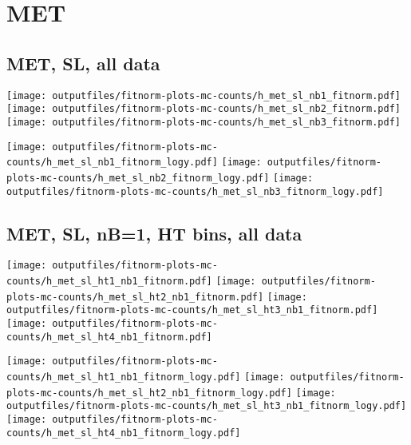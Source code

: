\documentclass[11pt]{article}
\begin{document}
  \pagebreak
  \clearpage
  \tableofcontents
  \clearpage





    \section{MET}
     \subsection{ MET, SL, all data}

    \noindent
     \texttt{[image: outputfiles/fitnorm-plots-mc-counts/h\_met\_sl\_nb1\_fitnorm.pdf]}
     \texttt{[image: outputfiles/fitnorm-plots-mc-counts/h\_met\_sl\_nb2\_fitnorm.pdf]}
     \texttt{[image: outputfiles/fitnorm-plots-mc-counts/h\_met\_sl\_nb3\_fitnorm.pdf]}

    \noindent
     \texttt{[image: outputfiles/fitnorm-plots-mc-counts/h\_met\_sl\_nb1\_fitnorm\_logy.pdf]}
     \texttt{[image: outputfiles/fitnorm-plots-mc-counts/h\_met\_sl\_nb2\_fitnorm\_logy.pdf]}
     \texttt{[image: outputfiles/fitnorm-plots-mc-counts/h\_met\_sl\_nb3\_fitnorm\_logy.pdf]}


     \subsection{ MET, SL, nB=1, HT bins, all data}


    \noindent
     \texttt{[image: outputfiles/fitnorm-plots-mc-counts/h\_met\_sl\_ht1\_nb1\_fitnorm.pdf]}
     \texttt{[image: outputfiles/fitnorm-plots-mc-counts/h\_met\_sl\_ht2\_nb1\_fitnorm.pdf]}
     \texttt{[image: outputfiles/fitnorm-plots-mc-counts/h\_met\_sl\_ht3\_nb1\_fitnorm.pdf]}
     \texttt{[image: outputfiles/fitnorm-plots-mc-counts/h\_met\_sl\_ht4\_nb1\_fitnorm.pdf]}

    \noindent
     \texttt{[image: outputfiles/fitnorm-plots-mc-counts/h\_met\_sl\_ht1\_nb1\_fitnorm\_logy.pdf]}
     \texttt{[image: outputfiles/fitnorm-plots-mc-counts/h\_met\_sl\_ht2\_nb1\_fitnorm\_logy.pdf]}
     \texttt{[image: outputfiles/fitnorm-plots-mc-counts/h\_met\_sl\_ht3\_nb1\_fitnorm\_logy.pdf]}
     \texttt{[image: outputfiles/fitnorm-plots-mc-counts/h\_met\_sl\_ht4\_nb1\_fitnorm\_logy.pdf]}
\end{document}
